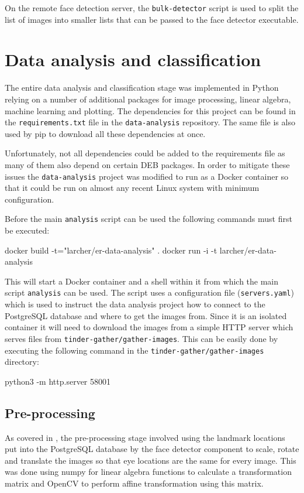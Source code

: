 On the remote face detection server, the \texttt{bulk-detector} script is used
to split the list of images into smaller lists that can be passed to the face
detector executable.

\section{Data analysis and classification}
The entire data analysis and classification stage was implemented in Python
relying on a number of additional packages for image processing, linear
algebra, machine learning and plotting. The dependencies for this project can
be found in the \texttt{requirements.txt} file in the \texttt{data-analysis}
repository. The same file is also used by \ac{pip} to download all these
dependencies at once.

Unfortunately, not all dependencies could be added to the requirements file as
many of them also depend on certain DEB packages. In order to mitigate these
issues the \texttt{data-analysis} project was modified to run as a Docker
\citep{docker} container so that it could be run on almost any recent Linux
system with minimum configuration.

Before the main \texttt{analysis} script can be used the following commands
must first be executed:
\begin{logs}
    docker build -t="larcher/er-data-analysis" . 
    docker run -i -t larcher/er-data-analysis
\end{logs}
This will start a Docker container and a shell within it from which the main
script \texttt{analysis} can be used. The script uses a configuration file
(\texttt{servers.yaml}) which is used to instruct the data analysis project how
to connect to the PostgreSQL database and where to get the images from. Since
it is an isolated container it will need to download the images from a simple
HTTP server which serves files from \texttt{tinder-gather/gather-images}. This
can be easily done by executing the following command in the
\texttt{tinder-gather/gather-images} directory:
\begin{logs}
    python3 -m http.server 58001
\end{logs}

\subsection{Pre-processing}
As covered in , the pre-processing stage involved
using the landmark locations put into the PostgreSQL database by the face
detector component to scale, rotate and translate the images so that eye
locations are the same for every image. This was done using numpy for linear
algebra functions to calculate a transformation matrix and OpenCV to perform
affine transformation using this matrix.

